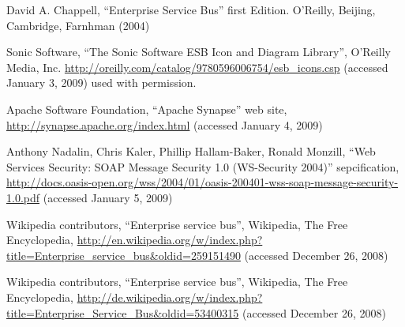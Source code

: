 %
%

\begin{thebibliography}{}

 David A. Chappell,
``Enterprise Service Bus'' first Edition. 
O'Reilly, Beijing, Cambridge, Farnhman (2004)

Sonic Software,
``The Sonic Software ESB Icon and Diagram Library'',
O'Reilly Media, Inc.
\url{http://oreilly.com/catalog/9780596006754/esb_icons.csp} (accessed January
3, 2009)
used with permission.

Apache Software Foundation, 
``Apache Synapse'' web site,
\url{http://synapse.apache.org/index.html} (accessed January 4, 2009)

Anthony Nadalin, Chris Kaler, Phillip Hallam-Baker, Ronald Monzill,
``Web Services Security: SOAP Message Security 1.0 (WS-Security 2004)''
sepcification,
\url{http://docs.oasis-open.org/wss/2004/01/oasis-200401-wss-soap-message-security-1.0.pdf}
(accessed January 5, 2009)

Wikipedia contributors,
``Enterprise service bus'', Wikipedia, The Free
Encyclopedia,
\url{http://en.wikipedia.org/w/index.php?title=Enterprise_service_bus&oldid=259151490}
(accessed December 26, 2008)

Wikipedia contributors,
``Enterprise service bus'',
Wikipedia, The Free Encyclopedia,
\url{http://de.wikipedia.org/w/index.php?title=Enterprise_Service_Bus&oldid=53400315}
(accessed December 26, 2008)

\end{thebibliography}
